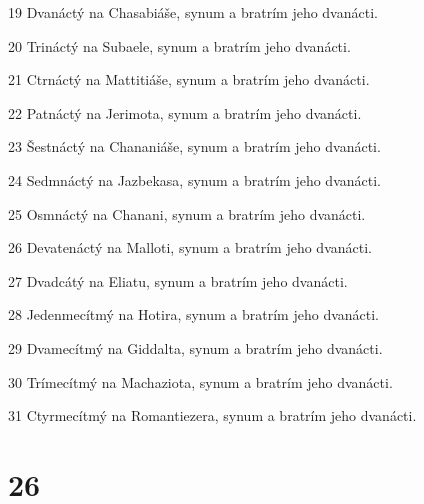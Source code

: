 \par 19 Dvanáctý na Chasabiáše, synum a bratrím jeho dvanácti.
\par 20 Trináctý na Subaele, synum a bratrím jeho dvanácti.
\par 21 Ctrnáctý na Mattitiáše, synum a bratrím jeho dvanácti.
\par 22 Patnáctý na Jerimota, synum a bratrím jeho dvanácti.
\par 23 Šestnáctý na Chananiáše, synum a bratrím jeho dvanácti.
\par 24 Sedmnáctý na Jazbekasa, synum a bratrím jeho dvanácti.
\par 25 Osmnáctý na Chanani, synum a bratrím jeho dvanácti.
\par 26 Devatenáctý na Malloti, synum a bratrím jeho dvanácti.
\par 27 Dvadcátý na Eliatu, synum a bratrím jeho dvanácti.
\par 28 Jedenmecítmý na Hotira, synum a bratrím jeho dvanácti.
\par 29 Dvamecítmý na Giddalta, synum a bratrím jeho dvanácti.
\par 30 Trímecítmý na Machaziota, synum a bratrím jeho dvanácti.
\par 31 Ctyrmecítmý na Romantiezera, synum a bratrím jeho dvanácti.

\chapter{26}

